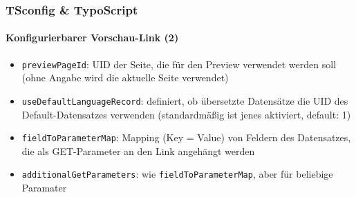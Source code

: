 \begin{frame}[fragile]
	\frametitle{TSconfig \& TypoScript}
	\framesubtitle{Konfigurierbarer Vorschau-Link (2)}

	\begin{itemize}
		\item \texttt{previewPageId}:\newline
			\smaller
				UID der Seite, die für den Preview verwendet werden soll\newline
				(ohne Angabe wird die aktuelle Seite verwendet)
			\normalsize
		\item \texttt{useDefaultLanguageRecord}:\newline
			\smaller
				definiert, ob übersetzte Datensätze die UID des Default-Datensatzes verwenden
				(standardmäßig ist jenes aktiviert, default: 1)
			\normalsize
		\item \texttt{fieldToParameterMap}:\newline
			\smaller
				Mapping (Key = Value) von Feldern des Datensatzes, die als GET-Parameter an den Link angehängt werden
			\normalsize
		\item \texttt{additionalGetParameters}:\newline
			\smaller
				wie \texttt{fieldToParameterMap}, aber für beliebige Paramater
			\normalsize
	\end{itemize}

\end{frame}

